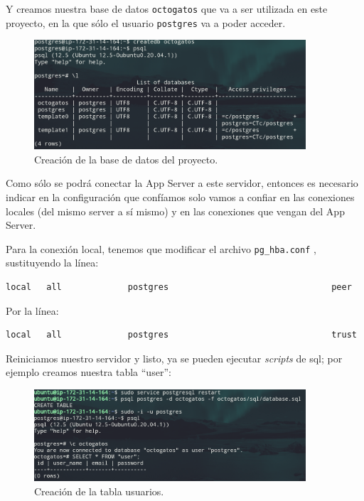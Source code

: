 \documentclass{article}
\newcommand{\ttt}[1]{%
\texttt{#1}%
}
\begin{document}
Y creamos nuestra base de datos \ttt{octogatos} que va a ser
utilizada en este proyecto, en la que sólo el usuario
\ttt{postgres} va a poder acceder.

\begin{figure}[H]
  \centering
  \includegraphics[width=0.9\textwidth]{DATASERVER/exhibitC}
  \caption{Creación de la base de datos del proyecto.}
  \label{fig:DATASERVER-C}
\end{figure}

Como sólo se podrá conectar la App Server a este servidor,
entonces es necesario indicar en la configuración que
confíamos solo vamos a confiar en las conexiones locales
(del mismo server a sí mismo) y en las conexiones que vengan
del App Server.

Para la conexión local, tenemos que modificar el archivo
\ttt{pg\_hba.conf}, sustituyendo la línea:

\begin{lstlisting}
local   all             postgres                                peer
\end{lstlisting}

Por la línea:
\begin{lstlisting}
local   all             postgres                                trust
\end{lstlisting}

Reiniciamos nuestro servidor y listo, ya se pueden ejecutar
\textit{scripts} de sql; por ejemplo creamos nuestra tabla
``user'':

\begin{figure}[H]
  \centering
  \includegraphics[width=0.9\textwidth]{DATASERVER/exhibitE}
  \caption{Creación de la tabla usuarios.}
  \label{fig:DATASERVER-E}
\end{figure}
\end{document}
